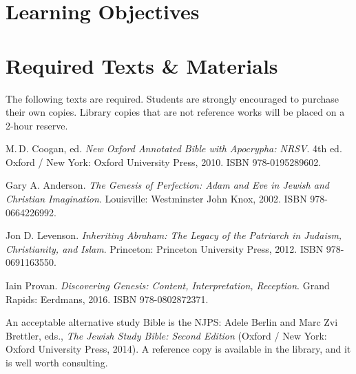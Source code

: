 \documentclass[titlepage]{article}
\newcommand\incl{../includes}
\begin{document}


\section{Learning Objectives}
\label{objectives}
\edobject

\section{Required Texts \& Materials}
\label{texts}

The following texts are required. Students are strongly encouraged to
purchase their own copies. Library copies that are not reference works
will be placed on a 2-hour reserve.

\begingroup
\renewcommand{\section}[2]{}%
\begin{thebibliography}{Anderson}%

	 M.\,D. Coogan, ed.
    \emph{New Oxford Annotated Bible with Apocrypha: NRSV}. 4th ed.
    Oxford / New York: Oxford University Press, 2010.
    ISBN 978-0195289602.


	 Gary A. Anderson.
	\emph{The Genesis of Perfection: Adam and Eve in Jewish and Christian Imagination}.
	Louisville: Westminster John Knox, 2002.
	ISBN 978-0664226992.

	 Jon D. Levenson.
	\emph{Inheriting Abraham: The Legacy of the Patriarch in Judaism, Christianity, and Islam}.
	Princeton: Princeton University Press, 2012.
	ISBN 978-0691163550.

	 Iain Provan.
	\emph{Discovering Genesis: Content, Interpretation, Reception}.
	Grand Rapids: Eerdmans, 2016.
	ISBN 978-0802872371.


\end{thebibliography}
\endgroup

An acceptable alternative study Bible is the NJPS: Adele Berlin and Marc
Zvi Brettler, eds., \emph{The Jewish Study Bible: Second Edition}
(Oxford / New York: Oxford University Press, 2014). A reference copy is
available in the library, and it is well worth consulting.
\end{document}
